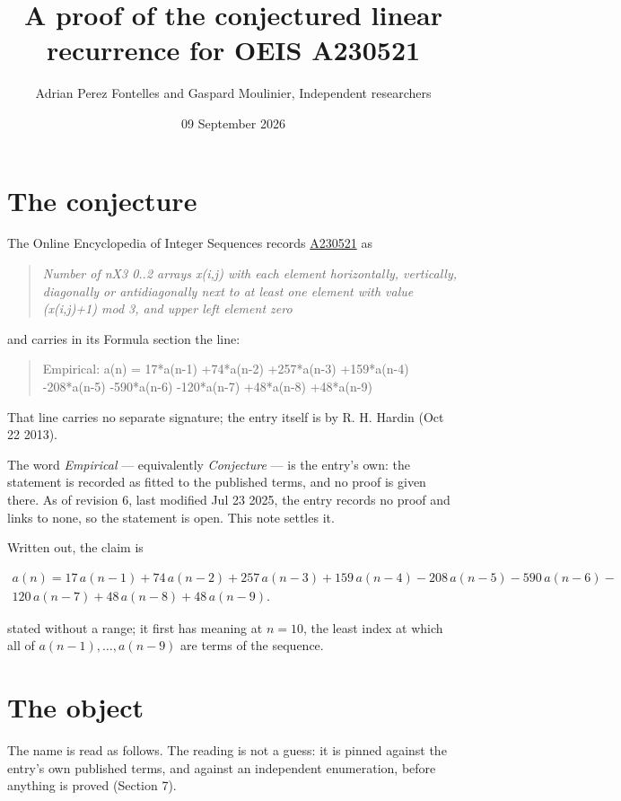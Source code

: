 \documentclass[11pt]{article}
\title{A proof of the conjectured linear recurrence for OEIS A230521}
\author{Adrian Perez Fontelles and Gaspard Moulinier, Independent researchers}
\date{09 September 2026}
\theoremstyle{definition}
\begin{document}
\maketitle
\section{The conjecture}

The Online Encyclopedia of Integer Sequences records \href{https://oeis.org/A230521}{A230521} as

\begin{quote}\itshape Number of nX3 0..2 arrays x(i,j) with each element horizontally, vertically, diagonally or antidiagonally next to at least one element with value (x(i,j)+1) mod 3, and upper left element zero\end{quote}

and carries in its Formula section the line:

\begin{quote}\ttfamily Empirical: a(n) = 17*a(n-1) +74*a(n-2) +257*a(n-3) +159*a(n-4) -208*a(n-5) -590*a(n-6) -120*a(n-7) +48*a(n-8) +48*a(n-9)\end{quote}

That line carries no separate signature; the entry itself is by R. H. Hardin (Oct 22 2013).

The word {\itshape Empirical} --- equivalently {\itshape Conjecture} --- is the entry's own: the statement is recorded as fitted to the published terms, and no proof is given there. As of revision 6, last modified Jul 23 2025, the entry records no proof and links to none, so the statement is open. This note settles it.

Written out, the claim is

\begin{multline*} a(n) = 17\,a(n-1) + 74\,a(n-2) + 257\,a(n-3) + 159\,a(n-4) - 208\,a(n-5) - 590\,a(n-6) - \\ 120\,a(n-7) + 48\,a(n-8) + 48\,a(n-9). \end{multline*}

stated without a range; it first has meaning at $n = 10$, the least index at which all of $a(n-1),\dots,a(n-9)$ are terms of the sequence.

\section{The object}

The name is read as follows. The reading is not a guess: it is pinned against the entry's own published terms, and against an independent enumeration, before anything is proved (Section 7).
\end{document}
